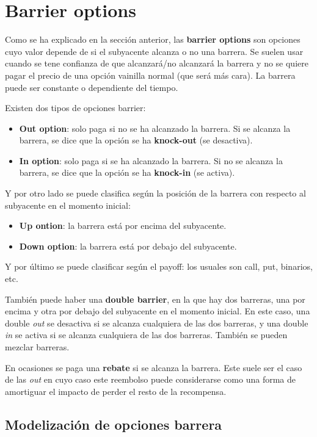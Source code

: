\section{Barrier options}\label{sec:barrier_options}
Como se ha explicado en la sección anterior, las \textbf{barrier options} son opciones cuyo valor depende de si el subyacente alcanza o no una barrera. Se suelen usar cuando se tene confianza de que alcanzará/no alcanzará la barrera y no se quiere pagar el precio de una opción vainilla normal (que será más cara). La barrera puede ser constante o dependiente del tiempo.

Existen dos tipos de opciones barrier:
\begin{itemize}
    \item \textbf{Out option}: solo paga si no se ha alcanzado la barrera. Si se alcanza la barrera, se dice que la opción se ha \textbf{knock-out} (se desactiva).
    \item \textbf{In option}: solo paga si se ha alcanzado la barrera. Si no se alcanza la barrera, se dice que la opción se ha \textbf{knock-in} (se activa).
\end{itemize}

Y por otro lado se puede clasifica según la posición de la barrera con respecto al subyacente en el momento inicial:
\begin{itemize}
    \item \textbf{Up ontion}: la barrera está por encima del subyacente.
    \item \textbf{Down option}: la barrera está por debajo del subyacente.
\end{itemize}

Y por último se puede clasificar según el payoff: los usuales son call, put, binarios, etc.

También puede haber una \textbf{double barrier}, en la que hay dos barreras, una por encima y otra por debajo del subyacente en el momento inicial. En este caso, una double \textit{out} se desactiva si se alcanza cualquiera de las dos barreras, y una double \textit{in} se activa si se alcanza cualquiera de las dos barreras. También se pueden mezclar barreras.

En ocasiones se paga una \textbf{rebate} si se alcanza la barrera. Este suele ser el caso de las \textit{out} en cuyo caso este reembolso puede considerarse como una forma de amortiguar el impacto de perder el resto de la recompensa.



\subsection{Modelización de opciones barrera}

